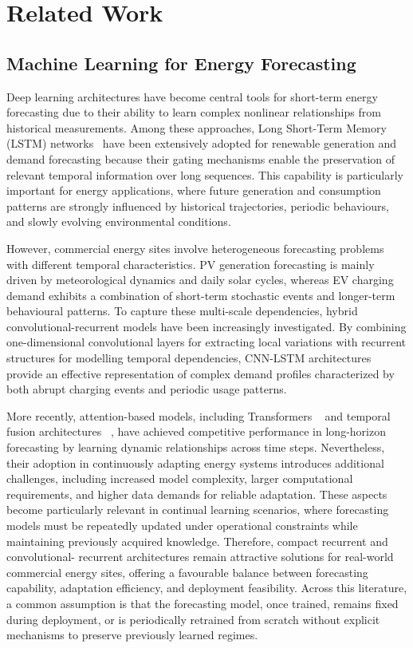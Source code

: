 \documentclass[journal]{IEEEtran}
\begin{document}
\section{Related Work}
\label{sec:related}

\subsection{Machine Learning for Energy Forecasting}
\label{sec:related_forecasting}

Deep learning architectures have become central tools for short-term energy
forecasting due to their ability to learn complex nonlinear relationships
from historical measurements. Among these approaches, Long Short-Term
Memory (LSTM) networks~\cite{hochreiter1997long} have been extensively
adopted for renewable generation and demand forecasting because their
gating mechanisms enable the preservation of relevant temporal information
over long sequences. This capability is particularly important for
energy applications, where future generation and consumption patterns are
strongly influenced by historical trajectories, periodic behaviours, and
slowly evolving environmental conditions.

However, commercial energy sites involve heterogeneous forecasting problems
with different temporal characteristics. PV generation forecasting is
mainly driven by meteorological dynamics and daily solar cycles, whereas
EV charging demand exhibits a combination of short-term stochastic events
and longer-term behavioural patterns. To capture these multi-scale
dependencies, hybrid convolutional-recurrent models have been increasingly
investigated. By combining one-dimensional convolutional layers for
extracting local variations with recurrent structures for modelling
temporal dependencies, CNN-LSTM architectures provide an effective
representation of complex demand profiles characterized by both abrupt
charging events and periodic usage patterns.

More recently, attention-based models, including Transformers
~\cite{vaswani2017attention} and temporal fusion architectures
~\cite{lim2021temporal}, have achieved competitive performance in
long-horizon forecasting by learning dynamic relationships across time
steps. Nevertheless, their adoption in continuously adapting energy
systems introduces additional challenges, including increased model
complexity, larger computational requirements, and higher data demands
for reliable adaptation. These aspects become particularly relevant in
continual learning scenarios, where forecasting models must be repeatedly
updated under operational constraints while maintaining previously
acquired knowledge. Therefore, compact recurrent and convolutional-
recurrent architectures remain attractive solutions for real-world
commercial energy sites, offering a favourable balance between forecasting
capability, adaptation efficiency, and deployment feasibility.
Across this literature, a common assumption is that the forecasting
model, once trained, remains fixed during deployment, or is periodically
retrained from scratch without explicit mechanisms to preserve
previously learned regimes.
\end{document}
